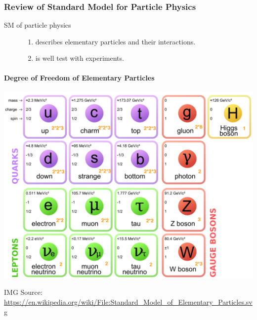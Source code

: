 \documentclass[letterpaper,10pt,english]{sphinxmanual}
\begin{document}
\subsubsection{Review of Standard Model for Particle Physics}
\label{Cosmology/cosmoIndex:review-of-standard-model-for-particle-physics}\begin{description}
\item[{SM of particle physics}] \leavevmode\begin{enumerate}
\item {} 
describes elementary particles and their interactions.

\item {} 
is well test with experiments.

\end{enumerate}

\end{description}


\paragraph{Degree of Freedom of Elementary Particles}
\label{Cosmology/cosmoIndex:degree-of-freedom-of-elementary-particles}
\includegraphics[width=1.000\linewidth]{Standard_Model_of_Elementary_Particles.png}

IMG Source: \href{https://en.wikipedia.org/wiki/File:Standard\_Model\_of\_Elementary\_Particles.svg}{https://en.wikipedia.org/wiki/File:Standard\_Model\_of\_Elementary\_Particles.svg}
\end{document}
